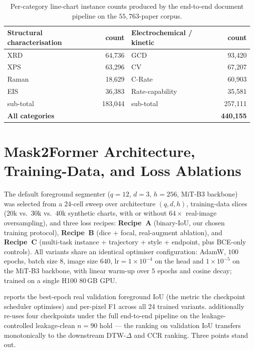 \documentclass{article}
\begin{document}
\begin{table}[h]
\centering
\caption{Per-category line-chart instance counts produced by the
end-to-end document pipeline on the $55{,}763$-paper corpus.}
\label{tab:doc-pipeline-corpus}
\small
\begin{tabular}{lr|lr}
\toprule
Structural characterisation & count & Electrochemical / kinetic & count \\
\midrule
XRD               & 64{,}736  & GCD                  & 93{,}420 \\
XPS               & 63{,}296  & CV                   & 67{,}207 \\
Raman             & 18{,}629  & C-Rate               & 60{,}903 \\
EIS               & 36{,}383  & Rate-capability      & 35{,}581 \\
\midrule
sub-total         & 183{,}044 & sub-total            & 257{,}111 \\
\midrule
\multicolumn{3}{l}{\textbf{All categories}} &  \textbf{440{,}155} \\
\bottomrule
\end{tabular}
\end{table}

\section{Mask2Former Architecture, Training-Data, and Loss Ablations}
\label{app:arch}
\setcounter{table}{0}\setcounter{figure}{0}

The default foreground segmenter ($q{=}12$, $d{=}3$, $h{=}256$,
MiT-B3 backbone) was selected from a 24-cell sweep over architecture
$(q,d,h)$, training-data slices ($20$k vs.\ $30$k vs.\ $40$k
synthetic charts, with or without $64{\times}$ real-image
oversampling), and three loss recipes:
\textbf{Recipe~A} (binary-IoU, our chosen training protocol),
\textbf{Recipe~B} (dice + focal, real-augment ablation), and
\textbf{Recipe~C} (multi-task instance + trajectory + style +
endpoint, plus BCE-only controls). All variants share an identical
optimiser configuration: AdamW, $100$ epochs, batch size $8$, image
size $640$, $\mathrm{lr}{=}1{\times}10^{-4}$ on the head and
$1{\times}10^{-5}$ on the MiT-B3 backbone, with linear warm-up over
$5$ epochs and cosine decay; trained on a single H100 80\,GB GPU.

 reports the best-epoch real validation
foreground IoU (the metric the checkpoint scheduler optimises) and
per-pixel F1 across all 24 trained variants. 
additionally re-uses four checkpoints under the full end-to-end
pipeline on the leakage-controlled leakage-clean $n{=}90$ hold --- the ranking
on validation IoU transfers monotonically to the downstream
DTW-$\Delta$ and CCR ranking. Three points stand out.
\end{document}
